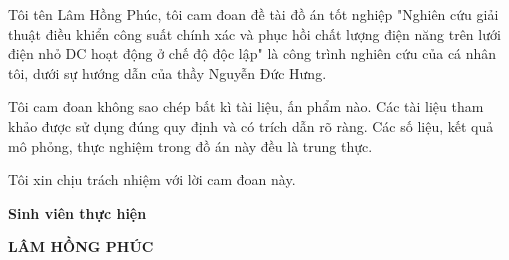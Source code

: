 \newpage
{}

Tôi tên Lâm Hồng Phúc, tôi cam đoan đề tài đồ án tốt nghiệp "Nghiên cứu giải thuật điều khiển công suất chính xác và phục hồi chất lượng điện năng trên lưới điện nhỏ DC hoạt động ở chế độ độc lập" là công trình nghiên cứu của cá nhân tôi, dưới sự hướng dẫn của thầy Nguyễn Đức Hưng. \par
Tôi cam đoan không sao chép bất kì tài liệu, ấn phẩm nào. Các tài liệu tham khảo được sử dụng đúng quy định và có trích dẫn rõ ràng. Các số liệu, kết quả mô phỏng, thực nghiệm trong đồ án này đều là trung thực. \par
Tôi xin chịu trách nhiệm với lời cam đoan này. \par

\vspace{1.5cm}
\hspace{8cm} \textbf{Sinh viên thực hiện}

\vspace{2.5cm}
\hspace{8cm} \textbf{LÂM HỒNG PHÚC}